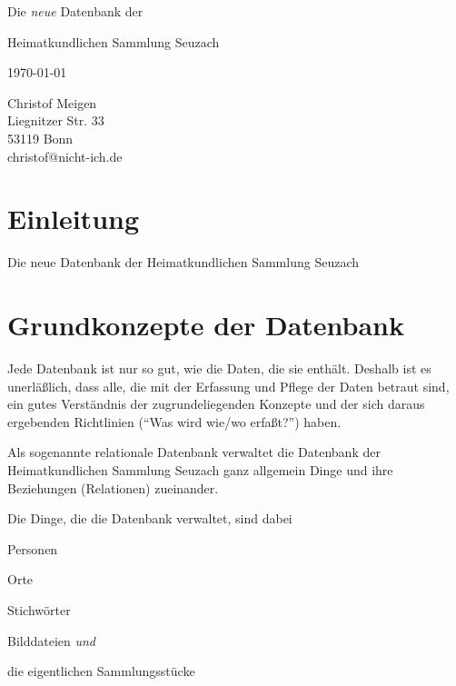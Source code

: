 \documentclass[12pt]{scrreprt}
\begin{document}
\def\DB{Datenbank der Heimatkundlichen Sammlung Seuzach}

\strut
\thispagestyle{empty}
\vfill


\begin{center}
  
{\Huge Die \textit{neue} Datenbank der

  \medskip
  
Heimatkundlichen Sammlung Seuzach}

\bigskip


\bigskip

\today
\end{center}


\vfill

\hfill \begin{minipage}{5cm}
  Christof Meigen\\
  Liegnitzer Str. 33 \\
53119 Bonn \\
christof@nicht-ich.de
\end{minipage}

\clearpage

\tableofcontents

\clearpage

\chapter{Einleitung}

Die neue Datenbank der Heimatkundlichen Sammlung Seuzach 

\chapter{Grundkonzepte der Datenbank}

Jede Datenbank ist nur so gut, wie die Daten, die sie enthält.
Deshalb ist es unerläßlich, dass alle, die mit der Erfassung und
Pflege der Daten betraut sind, ein gutes Verständnis der
zugrundeliegenden Konzepte und der sich daraus ergebenden Richtlinien
(``Was wird wie/wo erfaßt?'')  haben.

Als sogenannte relationale Datenbank verwaltet die \DB{} ganz allgemein Dinge und
ihre Beziehungen (Relationen) zueinander.

Die Dinge, die die Datenbank verwaltet, sind dabei
\begin{citemize}
\item Personen
\item Orte
\item Stichwörter
\item Bilddateien \textit{und}
\item die eigentlichen Sammlungsstücke
\end{citemize}
\end{document}
